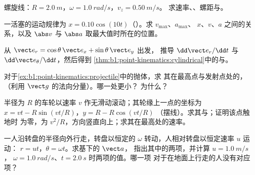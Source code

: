 \begin{exercise}[$\star\star$]\label{exo:b1:point-kinematics:7}
螺旋线：$R = \qty{2.0}{m}$，$\omega = \qty{1.0}{rad/s}$，$v_z = \qty{0.50}{m/s}$。
求速率、、螺距与。
\end{exercise}

\begin{exercise}[$\star\star$]\label{exo:b1:point-kinematics:8}
一活塞的运动规律为 $x = 0.10\cos(10t)$（）。求 $v_{\max}$、$a_{\max}$、
$x$、$v$、$a$ 之间的关系，以及
$\abs v$ 与 $\abs a$ 取最大值时所在的位置。
\end{exercise}

\begin{exercise}[$\star\star$]\label{exo:b1:point-kinematics:9}
从 $\vect e_r = \cos\theta\,\vect e_x + \sin\theta\,\vect e_y$ 出发，
推导 $\dd\vect e_r/\dd t$ 与 $\dd\vect e_\theta/\dd t$，然后得到
\cref{thm:b1:point-kinematics:cylindrical}中的与。
\end{exercise}

\begin{exercise}[$\star\star\star$]\label{exo:b1:point-kinematics:10}
对于\cref{ex:b1:point-kinematics:projectile}中的抛体，求
其在最高点与发射点处的，
（利用 $\vect g$ 的法向分量）。哪一处更小？
为什么？
\end{exercise}

\begin{exercise}[$\star\star\star$]\label{exo:b1:point-kinematics:11}
半径为 $R$ 的车轮以速率 $v$ 作无滑动滚动；其轮缘上一点的坐标为
$x = vt - R\sin(vt/R)$，$y = R - R\cos(vt/R)$
（摆线）。求其与；证明该点触地时
为零，为
$v^2/R$，方向竖直向上；求其在最高处的速率。
\end{exercise}

\begin{exercise}[$\star\star\star$]\label{exo:b1:point-kinematics:12}
一人沿转盘的半径向外行走，转盘以恒定的
$\omega$ 转动，人相对转盘以恒定速率 $u$ 运动：
$r = ut$，$\theta = \omega t$。求基下的 $\vect a$，
指出其中的两项，并计算 $u = \qty{1.0}{m/s}$，
$\omega = \qty{1.0}{rad/s}$、$t = \qty{2.0}{s}$ 时两项的值。哪一项
对于在地面上行走的人没有对应项？
\end{exercise}

